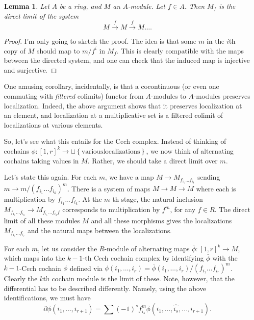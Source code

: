 \documentclass{article}
\newtheorem{lemma}{Lemma}
\begin{document}
\begin{lemma} 
Let $A$ be a ring, and $M$ an $A$-module. Let $f \in A$. Then $M_f$ is the
direct limit of the system
\[ M \stackrel{f}{\to} M \stackrel{f}{\to} M \dots.  \]
\end{lemma} 
\begin{proof} 
I'm only going to sketch the proof. The idea is that some $m$ in the $i$th
copy of $M$ should map to $m/f^i$ in $M_f$. This is clearly compatible with the
maps between the directed system, and one can check that the induced map is
injective and surjective.
\end{proof} 


One amusing corollary, incidentally, is that a cocontinuous (or even one
commuting with \emph{filtered} colimits) functor from
$A$-modules to $A$-modules preserves localization. Indeed, the above argument
shows that it preserves localization at an element, and localization at a
multiplicative set  is a filtered colimit of localizations at various elements.

So, let's see what this entails for the Cech complex. Instead of thinking of
cochains $\phi: [1,r]^k \to \sqcup \left\{\mathrm{various localizations}\right\}$,
we now think of alternating cochains taking values in $M$. Rather, we should
take a direct limit over $m$.

Let's state this again. For each $m$, we have a map $M \to M_{f_{i_1} \dots
f_{i_k}}$ sending $m \to m/(f_{i_1} \dots f_{i_k})^m$. There is a system of maps $M
\to M \to M$ where each is multiplication by $f_{i_1} \dots f_{i_k}$. At the
$m$-th stage, the natural inclusion $M_{f_{i_1} \dots f_{i_k}}  \to M_{f_{i_1}
\dots f_{i_k} f}$ corresponds to multiplication by $f^m$, for any $f \in R$.
The direct limit of all these modules $M$ and all these morphisms gives the
localizations $M_{f_{i_1} \dots f_{i_r}}$ and the natural maps between the
localizations.

For each $m$, let us consider the $R$-module of alternating maps  $\overline{\phi}: [1,r]^k \to
M$, which maps into the $k-1$-th Cech cochain complex by identifying $\overline{\phi}$
with the  $k-1$-Cech cochain $\phi$ defined via $\phi(i_1, \dots, i_r) =
\overline{\phi}(i_1, \dots, i_r)/ (f_{i_1}\dots f_{i_r})^m$.
Clearly the $k$th cochain module is the limit of these.  Note, however, that
the differential has to be described differently. 
Namely, using the above identifications, we must have
\[ \partial \overline{\phi}(i_1, \dots, i_{r+1}) = \sum (-1)^s f_{i_s}^m 
\overline{\phi}(i_1, \dots, \hat{i_s}, \dots, i_{r+1}).
\]
\end{document}
